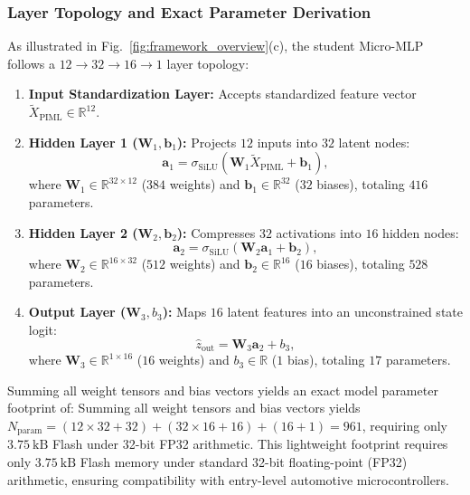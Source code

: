 \subsubsection{Layer Topology and Exact Parameter Derivation}
As illustrated in Fig.~\ref{fig:framework_overview}(c), the student Micro-MLP follows a $12 \to 32 \to 16 \to 1$ layer topology:
\begin{enumerate}
	\item \textbf{Input Standardization Layer:} Accepts standardized feature vector $\tilde{X}_{\text{PIML}} \in \mathbb{R}^{12}$.
	\item \textbf{Hidden Layer 1 ($\mathbf{W}_1, \mathbf{b}_1$):} Projects $12$ inputs into $32$ latent nodes:
	\begin{equation}
		\label{eq:mlp_layer1}
		\mathbf{a}_1 = \sigma_{\text{SiLU}}\left( \mathbf{W}_1 \tilde{X}_{\text{PIML}} + \mathbf{b}_1 \right),
	\end{equation}
	where $\mathbf{W}_1 \in \mathbb{R}^{32 \times 12}$ ($384$ weights) and $\mathbf{b}_1 \in \mathbb{R}^{32}$ ($32$ biases), totaling $416$ parameters.
	\item \textbf{Hidden Layer 2 ($\mathbf{W}_2, \mathbf{b}_2$):} Compresses $32$ activations into $16$ hidden nodes:
	\begin{equation}
		\label{eq:mlp_layer2}
		\mathbf{a}_2 = \sigma_{\text{SiLU}}\left( \mathbf{W}_2 \mathbf{a}_1 + \mathbf{b}_2 \right),
	\end{equation}
	where $\mathbf{W}_2 \in \mathbb{R}^{16 \times 32}$ ($512$ weights) and $\mathbf{b}_2 \in \mathbb{R}^{16}$ ($16$ biases), totaling $528$ parameters.
	\item \textbf{Output Layer ($\mathbf{W}_3, b_3$):} Maps $16$ latent features into an unconstrained state logit:
	\begin{equation}
		\label{eq:mlp_layer3}
		\hat{z}_{\text{out}} = \mathbf{W}_3 \mathbf{a}_2 + b_3,
	\end{equation}
	where $\mathbf{W}_3 \in \mathbb{R}^{1 \times 16}$ ($16$ weights) and $b_3 \in \mathbb{R}$ ($1$ bias), totaling $17$ parameters.
\end{enumerate}
Summing all weight tensors and bias vectors yields an exact model parameter footprint of:
Summing all weight tensors and bias vectors yields $N_{\text{param}} = (12\times 32+32) + (32\times 16+16) + (16+1) = 961$, requiring only $3.75\ \text{kB}$ Flash under 32-bit FP32 arithmetic.
This lightweight footprint requires only $3.75\ \text{kB}$ Flash memory under standard 32-bit floating-point (FP32) arithmetic, ensuring compatibility with entry-level automotive microcontrollers.

